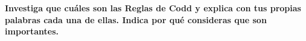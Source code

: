 \textbf{Investiga que cuáles son las Reglas de Codd y explica con tus propias palabras cada una de ellas. Indica por qué
consideras que son importantes.}\vspace{.3cm}

